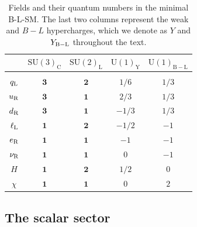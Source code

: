 \documentclass[a4paper,11pt]{article}
\renewcommand{\(}{\left(}
\renewcommand{\)}{\right)}
\renewcommand{\[}{\left[}
\renewcommand{\]}{\right]}
\newcommand{\U}[1]{\mathrm{U}(1)_{\mathrm{#1}}}			%
\newcommand{\SU}[2]{\mathrm{SU}(#1)_{\mathrm{#2}}}		%
\begin{document}
\begin{table}[htb!]
	\begin{center}
		\begin{tabular}{ccccc}
			& $\SU{3}{C}$ & $\SU{2}{L}$ & $\U{Y}$ & $\U{B-L}$  	\\    
			 \hline \vspace{-2mm} \\
			$q_{\rm L}$     			    							& $\bm{3}$		& $\bm{2}$	&	$1/6$ & $1/3$\vspace{1mm} \\
			$u_{\rm R}$     			    							& $\bm{3}$		& $\bm{1}$	&	$2/3$ & $1/3$\vspace{1mm}	\\
			$d_{\rm R}$     			    							& $\bm{3}$		& $\bm{1}$	&	$-1/3$ & $1/3$\vspace{1mm}\\
			$\ell_{\rm L}$     			    							& $\bm{1}$		& $\bm{2}$	&	$-1/2$ & $-1$\vspace{1mm}\\
			$e_{\rm R}$     			    							& $\bm{1}$		& $\bm{1}$	&	$-1$ & $-1$	\vspace{1mm} \\
			$\nu_{\rm R}$     			    							& $\bm{1}$		& $\bm{1}$	&	$0$ & $-1$ \vspace{1mm}\\
			$H$     			    							& $\bm{1}$		& $\bm{2}$	&	$1/2$ & $0$	\vspace{1mm}\\
			$\chi$     			    							& $\bm{1}$		& $\bm{1}$	&	$0$ & $2$\vspace{1mm}	\\
			\hline
		\end{tabular} 
		\caption{Fields and their quantum numbers in the minimal B-L-SM. The last two columns represent the weak and $B-L$ hypercharges, which we denote as $Y$ and $Y_{\rm B-L}$ throughout the text.}
		\label{tab:charges}  
	\end{center}
\end{table} 
% 

\subsection{The scalar sector}
\end{document}
